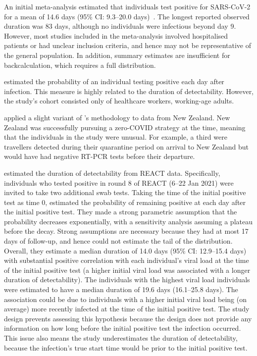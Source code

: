 \documentclass[thesis.tex]{subfiles}
\begin{document}
An initial meta-analysis estimated that individuals test positive for SARS-CoV-2 for a mean of 14.6 days (95\% CI: 9.3--20.0 days)~\autocite{cevikShedding}.
The longest reported observed duration was 83 days, although no individuals were infectious beyond day 9.
However, most studies included in the meta-analysis involved hospitalised patients or had unclear inclusion criteria, and hence may not be representative of the general population.
In addition, summary estimates are insufficient for backcalculation, which requires a full distribution.

\Textcite{hellewellPCRSensitivity} estimated the probability of an individual testing positive each day after infection.
This measure is highly related to the duration of detectability.
However, the study's cohort consisted only of healthcare workers, \ie working-age adults.

\Textcite{binnySensitivity} applied a slight variant of \textcite{hellewellPCRSensitivity}'s methodology to data from New Zealand.
New Zealand was successfully pursuing a zero-COVID strategy at the time, meaning that the individuals in the study were unusual.
For example, a third were travellers detected during their quarantine period on arrival to New Zealand but would have had negative RT-PCR tests before their departure.

\Textcite{ealesCharacterising} estimated the duration of detectability from REACT data.
Specifically, individuals who tested positive in round 8 of REACT (6--22 Jan 2021) were invited to take two additional swab tests.
Taking the time of the initial positive test as time 0, \textcite{ealesCharacterising} estimated the probability of remaining positive at each day after the initial positive test.
They made a strong parametric assumption that the probability decreases exponentially, with a sensitivity analysis assuming a plateau before the decay.
Strong assumptions are necessary because they had at most 17 days of follow-up, and hence could not estimate the tail of the distribution.
Overall, they estimate a median duration of 14.0 days (95\% CI: 12.9--15.4 days) with substantial positive correlation with each individual’s viral load at the time of the initial positive test (\ie a higher initial viral load was associated with a longer duration of detectability).
The individuals with the highest viral load individuals were estimated to have a median duration of 19.6 days (16.1--25.8 days).
The association could be due to individuals with a higher initial viral load being (on average) more recently infected at the time of the initial positive test.
The study design prevents assessing this hypothesis because the design does not provide any information on how long before the initial positive test the infection occurred.
This issue also means the study underestimates the duration of detectability, because the infection's true start time would be prior to the initial positive test.
\end{document}
